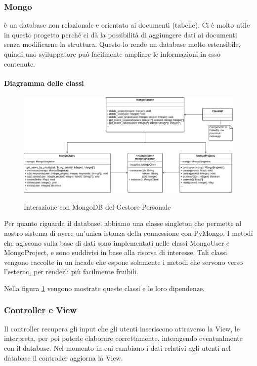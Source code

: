 \subsubsection{Mongo} \label{Mongo}
 è un database non relazionale e orientato ai documenti (tabelle). Ci è molto utile in questo progetto perché ci dà la possibilità di aggiungere dati ai documenti senza modificarne la struttura.
Questo lo rende un database molto estensibile, quindi uno sviluppatore può facilmente ampliare le informazioni in esso contenute.

    \paragraph{Diagramma delle classi}

    \begin{figure}[H]
        \centering
        \includegraphics[width=\textwidth]{img/GP-Mongo.png}\\
        \caption{Interazione con MongoDB del Gestore Personale}
        \label{fig:GP-Mongo}
    \end{figure}

    Per quanto riguarda il database, abbiamo una classe singleton che permette al nostro sistema di avere un'unica istanza della connessione con PyMongo.
    I metodi che agiscono sulla base di dati sono implementati nelle classi MongoUser e MongoProject, e sono suddivisi in base alla risorsa di interesse.
    Tali classi vengono raccolte in un facade che espone solamente i metodi che servono verso l’esterno, per renderli più facilmente fruibili. \par
    Nella figura \ref{fig:GP-Mongo} vengono mostrate queste classi e le loro dipendenze.


\subsubsection{Controller e View}
Il controller recupera gli input che gli utenti inseriscono attraverso la View, le interpreta, per poi poterle elaborare correttamente, interagendo eventualmente con il database. Nel momento in cui cambiano i dati relativi agli utenti nel database il controller aggiorna la View.


